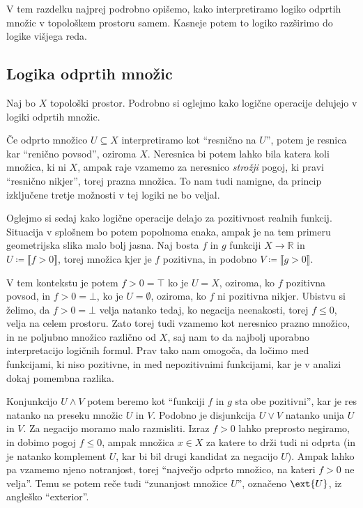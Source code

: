 
V tem razdelku najprej podrobno opišemo, kako interpretiramo logiko odprtih
množic v topološkem prostoru samem. Kasneje potem to logiko razširimo do logike
višjega reda.


\subsection{Logika odprtih množic}\label{sec:modeli-logika-odprtih}

Naj bo \(X\) topološki prostor. Podrobno si oglejmo kako logične operacije
delujejo v logiki odprtih množic.

Če odprto množico \(U ⊆ X\) interpretiramo kot ``resnično na \(U\)'', potem je
resnica kar ``renično povsod'', oziroma \(X\). Neresnica bi potem lahko bila
katera koli množica, ki ni \(X\), ampak raje vzamemo za neresnico \emph{strožji}
pogoj, ki pravi ``resnično nikjer'', torej prazna množica. To nam tudi namigne,
da princip izključene tretje možnosti v tej logiki ne bo veljal.

Oglejmo si sedaj kako logične operacije delajo za pozitivnost realnih funkcij.
Situacija v splošnem bo potem popolnoma enaka, ampak je na tem primeru
geometrijska slika malo bolj jasna. Naj bosta \(f\) in \(g\) funkciji \(X → ℝ\)
in \(U ≔ ⟦f > 0⟧\), torej množica kjer je \(f\) pozitivna, in podobno \(V ≔ ⟦g > 0⟧\).

V tem kontekstu je potem \(f > 0 = ⊤\) ko je \(U = X\), oziroma, ko \(f\)
pozitivna povsod, in \(f > 0 = ⊥\), ko je \(U = ∅\), oziroma, ko \(f\) ni
pozitivna nikjer. Ubistvu si želimo, da \(f > 0 = ⊥\) velja natanko tedaj, ko
negacija neenakosti, torej \(f ≤ 0\), velja na celem prostoru. Zato torej tudi
vzamemo kot neresnico prazno množico, in ne poljubno množico različno od \(X\),
saj nam to da najbolj uporabno interpretacijo logičnih formul. Prav tako nam
omogoča, da ločimo med funkcijami, ki niso pozitivne, in med nepozitivnimi
funkcijami, kar je v analizi dokaj pomembna razlika.

Konjunkcijo \(U ∧ V\) potem beremo kot ``funkciji \(f\) in \(g\) sta obe
pozitivni'', kar je res natanko na preseku množic \(U\) in \(V\). Podobno je
disjunkcija \(U ∨ V\) natanko unija \(U\) in \(V\).
Za negacijo moramo malo razmisliti. Izraz \(f > 0\) lahko preprosto negiramo, in
dobimo pogoj \(f ≤ 0\), ampak množica \(x ∈ X\) za katere to drži tudi ni odprta
(in je natanko komplement \(U\), kar bi bil drugi kandidat za negacijo \(U\)).
Ampak lahko pa vzamemo njeno notranjost, torej ``največjo odprto množico, na
kateri \(f > 0\) ne velja''. Temu se potem reče tudi ``zunanjost množice
\(U\)'', označeno \(\ext{U}\), iz angleško ``\foreignlanguage{english}{exterior}''.

